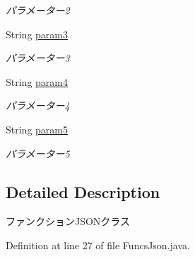 \begin{DoxyCompactItemize}
\begin{DoxyCompactList}\small\item\em パラメーター2 \end{DoxyCompactList}\item 
\mbox{\label{classjp_1_1gr_1_1java__conf_1_1yuta__yoshinaga_1_1reversi_1_1model_1_1_funcs_json_a90c439852b243b45c68efe96ca46fa97}} 
String \hyperlink{classjp_1_1gr_1_1java__conf_1_1yuta__yoshinaga_1_1reversi_1_1model_1_1_funcs_json_a90c439852b243b45c68efe96ca46fa97}{param3}
\begin{DoxyCompactList}\small\item\em パラメーター3 \end{DoxyCompactList}\item 
\mbox{\label{classjp_1_1gr_1_1java__conf_1_1yuta__yoshinaga_1_1reversi_1_1model_1_1_funcs_json_a9656484f8db51bdace618bcdbc3497b9}} 
String \hyperlink{classjp_1_1gr_1_1java__conf_1_1yuta__yoshinaga_1_1reversi_1_1model_1_1_funcs_json_a9656484f8db51bdace618bcdbc3497b9}{param4}
\begin{DoxyCompactList}\small\item\em パラメーター4 \end{DoxyCompactList}\item 
\mbox{\label{classjp_1_1gr_1_1java__conf_1_1yuta__yoshinaga_1_1reversi_1_1model_1_1_funcs_json_ac1bb96b21d4b526a690a3c1a6a88d49b}} 
String \hyperlink{classjp_1_1gr_1_1java__conf_1_1yuta__yoshinaga_1_1reversi_1_1model_1_1_funcs_json_ac1bb96b21d4b526a690a3c1a6a88d49b}{param5}
\begin{DoxyCompactList}\small\item\em パラメーター5 \end{DoxyCompactList}\end{DoxyCompactItemize}


\subsection{Detailed Description}
ファンクション\+J\+S\+O\+Nクラス 

Definition at line 27 of file Funcs\+Json.\+java.




